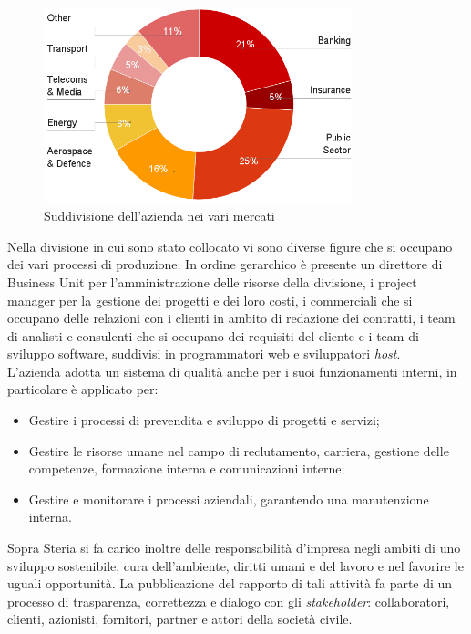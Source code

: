 	\begin{figure}[H]
	\centering
	   	\includegraphics[width=0.8\textwidth]{immagini/mercati_principali}
	   	\caption{Suddivisione dell'azienda nei vari mercati}
	\end{figure}
	
	Nella divisione in cui sono stato collocato vi sono diverse figure che si occupano dei vari processi di produzione. In ordine gerarchico è presente un direttore di Business Unit per l'amministrazione delle risorse della divisione, i project manager per la gestione dei progetti e dei loro costi, i commerciali che si occupano delle relazioni con i clienti in ambito di redazione dei contratti, i team di analisti e consulenti che si occupano dei requisiti del cliente e i team di sviluppo software, suddivisi in programmatori web e sviluppatori \textit{host}.\\
	
	L'azienda adotta un sistema di qualità anche per i suoi funzionamenti interni, in particolare è applicato per:
	
	\begin{itemize}
		\item Gestire i processi di prevendita e sviluppo di progetti e servizi;
		\item Gestire le risorse umane nel campo di reclutamento, carriera, gestione delle competenze, formazione interna e comunicazioni interne;
		\item Gestire e monitorare i processi aziendali, garantendo una manutenzione interna.
	\end{itemize}
	
	Sopra Steria si fa carico inoltre delle responsabilità d'impresa negli ambiti di uno sviluppo sostenibile, cura dell'ambiente, diritti umani e del lavoro e nel favorire le uguali opportunità. La pubblicazione del rapporto di tali attività fa parte di un processo di trasparenza, correttezza e dialogo con gli \textit{stakeholder}: collaboratori, clienti, azionisti, fornitori, partner e attori della società civile.
	\newpage
